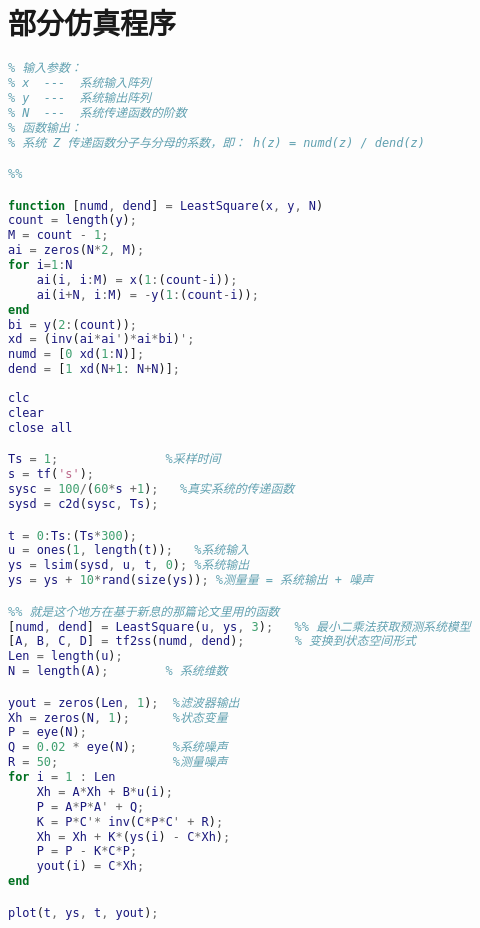 \chapter{部分仿真程序}\label{ch:fz}
\begin{lstlisting}[language=Matlab,caption={最小二乘法获取系统传递函数}]
%%
% 输入参数：
% x  ---  系统输入阵列
% y  ---  系统输出阵列
% N  ---  系统传递函数的阶数
% 函数输出：
% 系统 Z 传递函数分子与分母的系数，即： h(z) = numd(z) / dend(z)

%%

function [numd, dend] = LeastSquare(x, y, N)
count = length(y);
M = count - 1;
ai = zeros(N*2, M);
for i=1:N
    ai(i, i:M) = x(1:(count-i));
    ai(i+N, i:M) = -y(1:(count-i));
end
bi = y(2:(count));
xd = (inv(ai*ai')*ai*bi)';
numd = [0 xd(1:N)];
dend = [1 xd(N+1: N+N)];
\end{lstlisting}
\begin{lstlisting}[language=Matlab,caption={拥有精确模型的卡尔曼滤波}]
clc
clear
close all

Ts = 1;               %采样时间
s = tf('s');
sysc = 100/(60*s +1);   %真实系统的传递函数
sysd = c2d(sysc, Ts);

t = 0:Ts:(Ts*300);
u = ones(1, length(t));   %系统输入
ys = lsim(sysd, u, t, 0); %系统输出
ys = ys + 10*rand(size(ys)); %测量量 = 系统输出 + 噪声

%% 就是这个地方在基于新息的那篇论文里用的函数
[numd, dend] = LeastSquare(u, ys, 3);   %% 最小二乘法获取预测系统模型
[A, B, C, D] = tf2ss(numd, dend);       % 变换到状态空间形式
Len = length(u);
N = length(A);        % 系统维数

yout = zeros(Len, 1);  %滤波器输出
Xh = zeros(N, 1);      %状态变量
P = eye(N);
Q = 0.02 * eye(N);     %系统噪声
R = 50;                %测量噪声
for i = 1 : Len
    Xh = A*Xh + B*u(i);
    P = A*P*A' + Q;
    K = P*C'* inv(C*P*C' + R);
    Xh = Xh + K*(ys(i) - C*Xh);
    P = P - K*C*P;
    yout(i) = C*Xh;
end

plot(t, ys, t, yout);
\end{lstlisting}
